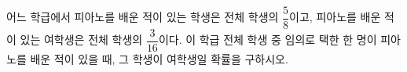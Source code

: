 어느 학급에서 피아노를 배운 적이 있는 학생은 전체 학생의 $\dfrac{5}{8}$이고, 피아노를 배운 적이 있는 여학생은 전체 학생의 $\dfrac{3}{16}$이다. 이 학급 전체 학생 중 임의로 택한 한 명이 피아노를 배운 적이 있을 때, 그 학생이 여학생일 확률을 구하시오.
